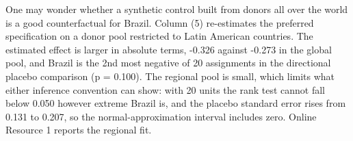 \documentclass[referee,pdflatex,sn-basic]{sn-jnl}
\renewenvironment{table}[1][]{\tableorg[#1]}{\endtableorg\normalfont}
\theoremstyle{thmstylethree}
\begin{document}
One may wonder whether a synthetic control built from donors all over the world is a good counterfactual for Brazil. Column (5) re-estimates the preferred specification on a donor pool restricted to Latin American countries. The estimated effect is larger in absolute terms, -0.326 against -0.273 in the global pool, and Brazil is the 2nd most negative of 20 assignments in the directional placebo comparison (p = 0.100). The regional pool is small, which limits what either inference convention can show: with 20 units the rank test cannot fall below 0.050 however extreme Brazil is, and the placebo standard error rises from 0.131 to 0.207, so the normal-approximation interval includes zero. Online Resource 1 reports the regional fit.

\begin{table}[H]
\centering
\caption{\label{tab:outcome-robustness-table}Brazil SDiD estimates across main and robustness specifications.}
\centering
{}
\end{table}
\end{document}
